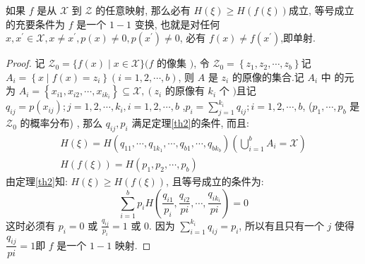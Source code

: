 \begin{theorem}\label{the3}
  如果 $ f $ 是从 $ \mathscr{X} $ 到 $ \mathscr{Z} $ 的任意映射, 那么必有 $ H(\xi) \geqslant H(f(\xi)) $成立, 等号成立的充要条件为 $ f $ 是一个 $ 1-1 $ 变换, 也就是对任何 $ x, x^{\prime} \in \mathscr{X}, x \neq x^{\prime}, p(x) \neq 0, p\left(x^{\prime}\right) \neq 0 $, 必有 $ f(x) \neq f\left(x^{\prime}\right) $,即单射.
\end{theorem}

\begin{proof}
记 $ \mathscr{Z}_{0}=\{f(x) \mid x \in \mathscr{X}\}(f $ 的像集 $ ) $, 令 $ \mathscr{Z}_{0}=\left\{z_{1}, z_{2}, \cdots, z_{b}\right\} $记 $ A_{i}=\left\{x \mid f(x)=z_{i}\right\}(i=1,2, \cdots, b) $, 则 $ A $ 是 $ z_{i} $ 的原像的集合.记 $ A_{i} $ 中 的元为 $ A_{i}=\left\{x_{i 1}, x_{i 2}, \cdots, x_{i k_{i}}\right\} \subseteq \mathscr{X},\left(z_{i}\right. $ 的原像有 $ k_{i} $ 个 $ ) $且记 $ q_{i j}=p\left(x_{i j}\right) ; j=1,2, \cdots, k_{i},  i=1,2, \cdots, b $ ,$ p_{i}=\sum\limits_{j=1}^{k_{i}} q_{i j} ; i=1,2, \cdots, b$, ($p_{1}, \cdots, p_{b} $ 是 $ \mathscr{Z}_{0} $ 的概率分布) , 那么 $ q_{i j}, p_{i} $ 满足定理\ref{th2}的条件, 而且:
$$
\begin{array}{l}
H(\xi)=H\left(q_{11}, \cdots, q_{1 k_{1}}, \cdots, q_{b 1}, \cdots, q_{b k_{b}}\right)\left(\bigcup\limits_{i=1}^{b} A_{i}=\mathscr{X}\right) \\
H(f(\xi))=H\left(p_{1}, p_{2}, \cdots, p_{b}\right)
\end{array}
$$
由定理\ref{th2}知: $ H(\xi) \geqslant H(f(\xi)) $, 且等号成立的条件为:
$$
\sum_{i=1}^{b} p_{i} H\left(\frac{q_{i 1}}{p_{i}}, \frac{q_{i 2}}{p i}, \cdots, \frac{q_{i k_{i}}}{p i}\right)=0
$$
这时必须有 $ p_{i}=0 $ 或 $ \frac{q_{i j}}{p _i}=1 $ 或 0.
因为 $ \sum\limits_{i=1}^{k_{i}} q_{i j}=p_{i} $, 所以有且只有一个 $ j $ 使得 $ \dfrac{q_{i j}}{p i}=1 $即 $ f $ 是一个 $ 1-1 $ 映射.
\end{proof}

